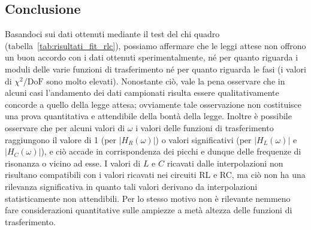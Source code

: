 \documentclass[a4paper]{article}
\begin{document}
\subsection{Conclusione}
Basandoci sui dati ottenuti mediante il test del chi quadro (tabella~\ref{tab:risultati_fit_rlc}), possiamo affermare che le leggi attese non offrono un buon accordo con i dati ottenuti sperimentalmente, né per quanto riguarda i moduli delle varie funzioni di trasferimento né per quanto riguarda le fasi (i valori di $\chi^2/\text{DoF}$ sono molto elevati). Nonostante ciò, vale la pena osservare che in alcuni casi l'andamento dei dati campionati risulta essere qualitativamente concorde a quello della legge attesa; ovviamente tale osservazione non costituisce una prova quantitativa e attendibile della bontà della legge. Inoltre è possibile osservare che per alcuni valori di $\omega$ i valori delle funzioni di trasferimento raggiungono il valore di 1 (per $|H_R(\omega)|$) o valori significativi (per $|H_L(\omega)|$ e $|H_C(\omega)|$), e ciò accade in corrispondenza dei picchi e dunque delle frequenze di risonanza o vicino ad esse. I valori di $L$ e $C$ ricavati dalle interpolazioni non risultano compatibili con i valori ricavati nei circuiti RL e RC, ma ciò non ha una rilevanza significativa in quanto tali valori derivano da interpolazioni statisticamente non attendibili. Per lo stesso motivo non è rilevante nemmeno fare considerazioni quantitative sulle ampiezze a metà altezza delle funzioni di trasferimento.
\end{document}
